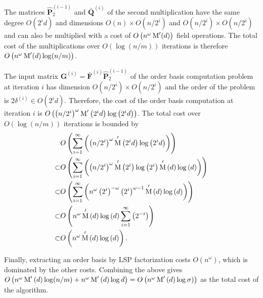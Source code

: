 \begin{pf}
The matrices $\hat{\mathbf{P}}_{2}^{\left(i-1\right)}$ and $\bar{\mathbf{Q}}^{\left(i\right)}$
of the second multiplication have the same degree $O(2^{i}d)$ and
dimensions $O\left(n\right)\times O(n/2^{i})$ and $O(n/2^{i})\times O(n/2^{i})$
and can also be multiplied with a cost of $O\left(n^{\omega}\M'(d)\right)$
field operations. The total cost of the multiplications over $O(\log\left(n/m\right))$
iterations is therefore $O\left(n^{\omega}\M'(d)\log(n/m)\right)$.

The input matrix $\mathbf{G}^{\left(i\right)}=\bar{\mathbf{F}}^{\left(i\right)}\hat{\mathbf{P}}_{2}^{\left(i-1\right)}$
of the order basis computation problem at iteration $i$ has dimension
$O(n/2^{i})\times O(n/2^{i})$ and the order of the problem is $2\delta^{\left(i\right)}\in O(2^{i}d)$.
Therefore, the cost of the order basis computation at iteration $i$
is $O\left(\left(n/2^{i}\right)^{\omega}\M'\left(2^{i}d\right)\log\left(2^{i}d\right)\right)$.
The total cost over $O(\log\left(n/m\right))$ iterations is bounded
by \begin{align*}
 & O\left(\sum_{i=1}^{\infty}\left(\left(n/2^{i}\right)^{\omega}\M'\left(2^{i}d\right)\log\left(2^{i}d\right)\right)\right)\\
\subset & O\left(\sum_{i=1}^{\infty}\left(\left(n/2^{i}\right)^{\omega}\M'\left(2^{i}\right)\log\left(2^{i}\right)\M'\left(d\right)\log\left(d\right)\right)\right)\\
\subset & O\left(\sum_{i=1}^{\infty}\left(n^{\omega}\left(2^{i}\right)^{-\omega}\left(2^{i}\right)^{\omega-1}\M'\left(d\right)\log\left(d\right)\right)\right)\\
\subset & O\left(n^{\omega}\M'\left(d\right)\log\left(d\right)\sum_{i=1}^{\infty}\left(2^{-i}\right)\right)\\
\subset & O\left(n^{\omega}\M'\left(d\right)\log\left(d\right)\right).\end{align*}


Finally, extracting an order basis by LSP factorization costs $O\left(n^{\omega}\right)$,
which is dominated by the other costs. Combining the above gives $O\left(n^{\omega}\M'\left(d\right)\log(n/m)+n^{\omega}\M'\left(d\right)\log d\right)=O\left(n^{\omega}\M'\left(d\right)\log\sigma)\right)$
as the total cost of the algorithm. 
\end{pf}

